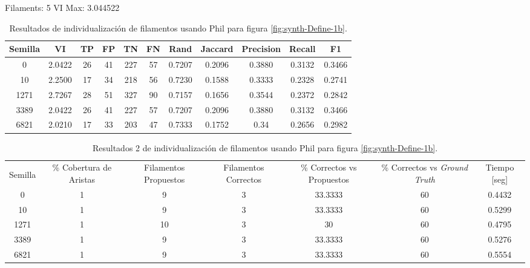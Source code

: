 Filaments: 5	VI Max: 3.044522
\begin{table}[h]
    \centering
    \begin{tabular}{|c|c|c|c|c|c|c|c|c|c|c|}
    \hline
        Semilla & VI & TP & FP &TN &FN & Rand	& Jaccard &	Precision &	Recall &	F1 \\ \hline 
        0   & 2.0422 & 26 & 41 & 227 & 57 & 0.7207 & 0.2096 & 0.3880 & 0.3132 & 0.3466 \\
        10 & 2.2500 & 17 & 34 & 218 & 56 & 0.7230 & 0.1588 & 0.3333 & 0.2328 & 0.2741\\
        1271 & 2.7267 & 28 & 51 & 327 & 90 & 0.7157 & 0.1656 & 0.3544 & 0.2372 & 0.2842\\
        3389 & 2.0422 & 26 & 41 & 227 & 57 & 0.7207 & 0.2096 & 0.3880 & 0.3132 & 0.3466\\
        6821 & 2.0210 & 17 & 33 & 203 & 47 & 0.7333 & 0.1752 & 0.34 & 0.2656 & 0.2982\\
        \hline
    \end{tabular}
    \caption{Resultados de individualizaci\'on de filamentos usando Phil para figura \ref{fig:synth-Define-1b}.}
    \label{tab:Synth-Define-1b-DetailedResults1}
\end{table}

\begin{table}[h]
    \centering
    \begin{tabular}{|c|c|c|c|c|c|c|}
    \hline
         & \multirow{4}{2cm}{\centering \% Cobertura de Aristas} & \multirow{4}{2cm}{Filamentos Propuestos} & \multirow{4}{2cm}{Filamentos Correctos} & \multirow{4}{2.5cm}{\% Correctos vs Propuestos} & \multirow{4}{2.5cm}{\centering \% Correctos vs {\it Ground Truth}} & \multirow{4}{1.2cm}{\centering Tiempo [seg]} \\
         &  &  &  & & &  \\
        Semilla &  &  &  & & &  \\
        &  &  &  & & &  \\ \hline 
        0 & 1 & 9  & 3 & 33.3333 & 60 & 0.4432\\
        10 & 1 & 9  & 3 & 33.3333 & 60 & 0.5299\\
        1271 & 1 & 10 & 3 & 30 & 60 & 0.4795\\
        3389 & 1 & 9  & 3 & 33.3333 & 60 & 0.5276\\
        6821 & 1 & 9  & 3 & 33.3333 & 60 & 0.5554\\
        \hline
    \end{tabular}
    \caption{Resultados 2 de individualizaci\'on de filamentos usando Phil para figura \ref{fig:synth-Define-1b}.}
    \label{tab:Synth-Define-1b-DetailedResults2}
\end{table}



